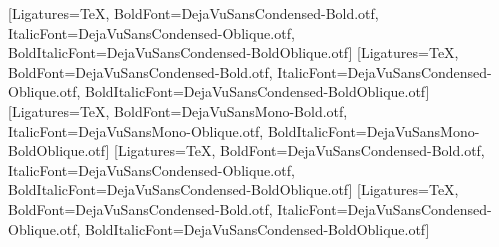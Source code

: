 %
%
\setmainfont[ExternalLocation=./]{DejaVuSansCondensed.otf}%
  [Ligatures=TeX,
  BoldFont=DejaVuSansCondensed-Bold.otf,
  ItalicFont=DejaVuSansCondensed-Oblique.otf,
  BoldItalicFont=DejaVuSansCondensed-BoldOblique.otf]
\setsansfont[ExternalLocation=./]{DejaVuSansCondensed.otf}%
  [Ligatures=TeX,
  BoldFont=DejaVuSansCondensed-Bold.otf,
  ItalicFont=DejaVuSansCondensed-Oblique.otf,
  BoldItalicFont=DejaVuSansCondensed-BoldOblique.otf]
\setmonofont[ExternalLocation=./]{DejaVuSansMono.otf}%
  [Ligatures=TeX,
  BoldFont=DejaVuSansMono-Bold.otf,
  ItalicFont=DejaVuSansMono-Oblique.otf,
  BoldItalicFont=DejaVuSansMono-BoldOblique.otf]
%
  [Ligatures=TeX,
  BoldFont=DejaVuSansCondensed-Bold.otf,
  ItalicFont=DejaVuSansCondensed-Oblique.otf,
  BoldItalicFont=DejaVuSansCondensed-BoldOblique.otf]
\newfontfamily{}%
  [Ligatures=TeX,
  BoldFont=DejaVuSansCondensed-Bold.otf,
  ItalicFont=DejaVuSansCondensed-Oblique.otf,
  BoldItalicFont=DejaVuSansCondensed-BoldOblique.otf]
\newfontfamily{}
\usepackage[CJK]{ucharclasses}
\setTransitionsForCJK{\mycjkfont}{\myregularfont}
%
%
